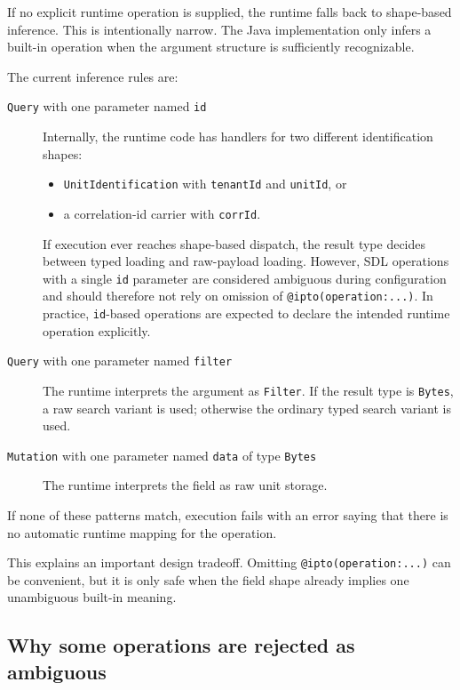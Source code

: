 If no explicit runtime operation is supplied, the runtime falls back to shape-based inference. This is intentionally narrow. The Java implementation only infers a built-in operation when the argument structure is sufficiently recognizable.

The current inference rules are:
\begin{description}
\item[\texttt{Query} with one parameter named \texttt{id}] Internally, the runtime code has handlers for two different identification shapes:
    \begin{itemize}
    \item \texttt{UnitIdentification} with \texttt{tenantId} and \texttt{unitId}, or
    \item a correlation-id carrier with \texttt{corrId}.
    \end{itemize}
    If execution ever reaches shape-based dispatch, the result type decides between typed loading and raw-payload loading. However, SDL operations with a single \texttt{id} parameter are considered ambiguous during configuration and should therefore not rely on omission of \texttt{@ipto(operation:...)}. In practice, \texttt{id}-based operations are expected to declare the intended runtime operation explicitly.

\vspace{.2cm}

\item[\texttt{Query} with one parameter named \texttt{filter}] The runtime interprets the argument as \texttt{Filter}. If the result type is \texttt{Bytes}, a raw search variant is used; otherwise the ordinary typed search variant is used.

\vspace{.2cm}

\item[\texttt{Mutation} with one parameter named \texttt{data} of type \texttt{Bytes}] The runtime interprets the field as raw unit storage.
\end{description}

If none of these patterns match, execution fails with an error saying that there is no automatic runtime mapping for the operation.

This explains an important design tradeoff. Omitting \texttt{@ipto(operation:...)} can be convenient, but it is only safe when the field shape already implies one unambiguous built-in meaning.

\subsection{Why some operations are rejected as ambiguous}

